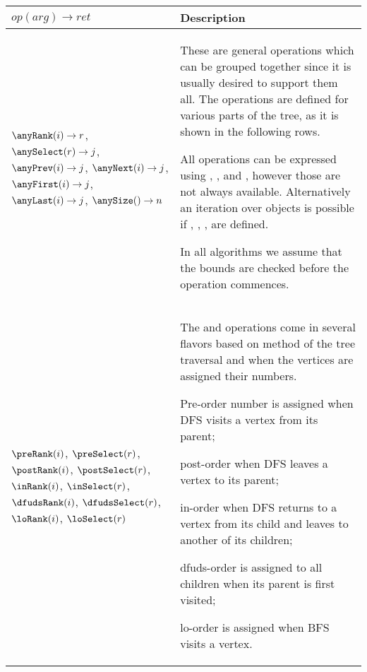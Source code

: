 \begin{table}
	\centering
	\begin{tabularx}{\textwidth}{|L{0.7}|J{1.3}|}
		\hline
		$\mathit{op}(\mathit{arg}) \rightarrow \mathit{ret}$
		& Description \\ \hline \hline
		
		$\anyRank(i) \rightarrow r$, \newline
		$\anySelect(r) \rightarrow j$, \newline
		$\anyPrev(i) \rightarrow j$, \newline
		$\anyNext(i) \rightarrow j$, \newline
		$\anyFirst(i) \rightarrow j$, \newline
		$\anyLast(i) \rightarrow j$, \newline
		$\anySize() \rightarrow n$
		& These are general operations which can be grouped together since it is usually desired to support them all.
		The operations are defined for various parts of the tree, as it is shown in the following rows.
		
		All operations can be expressed using \anyRank{}, \anySelect{}, and \anySize, however those are not always available.
		Alternatively an iteration over objects is possible if \anyPrev{}, \anyNext{}, \anyFirst{}, \anyLast{} are defined.
		
		In all algorithms we assume that the bounds are checked before the operation commences.\\ \hline \hline
		
		$\preRank(i)$, $\preSelect(r)$, \newline
		$\postRank(i)$, $\postSelect(r)$, \newline
		$\inRank(i)$, $\inSelect(r)$, \newline
		$\dfudsRank(i)$, $\dfudsSelect(r)$, \newline
		$\loRank(i)$, $\loSelect(r)$
		& The \rank{} and \select{} operations come in several flavors based on method of the tree traversal and when the vertices are assigned their numbers.
		\begin{itemize*}
			\item Pre-order number is assigned when DFS visits a vertex from its parent;
			\item post-order when DFS leaves a vertex to its parent;
			\item in-order when DFS returns to a vertex from its child and leaves to another of its children;
			\item dfuds-order is assigned to all children when its parent is first visited;
			\item lo-order is assigned when BFS visits a vertex.
		\end{itemize*}\\ \hline
		

\end{tabularx}
\end{table}
